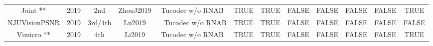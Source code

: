 \begin{tabular}{cccccccccccc}
Joint **      & 2019 & 2nd         & ZhouJ2019       & Tucodec w/o RNAB                 & TRUE             & TRUE        & FALSE & FALSE & FALSE & FALSE     & TRUE              \\
NJUVisionPSNR & 2019 & 3rd/4th     & Lu2019          & ~ Tucodec w/o RNAB               & TRUE             & TRUE        & FALSE & FALSE & FALSE & FALSE     & FALSE             \\
Vimicro **    & 2019 & 4th         & Li2019          & Tucodec w/o RNAB                 & TRUE             & TRUE        & FALSE & FALSE & FALSE & FALSE     & TRUE              \\
\end{tabular}
